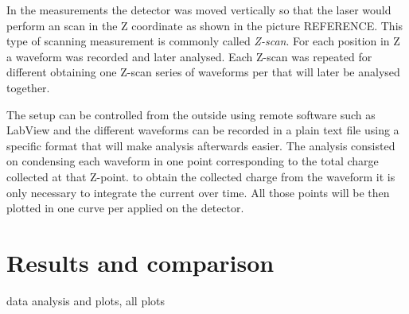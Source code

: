In the measurements the detector was moved vertically so that the laser would perform an scan in the Z coordinate as shown in the picture REFERENCE. This type of scanning measurement is commonly called \textit{Z-scan}. For each position in Z a waveform was recorded and later analysed. Each Z-scan was repeated for different \vias obtaining one Z-scan series of waveforms per \vias that will later be analysed together. 

The setup can be controlled from the outside using remote software such as LabView and the different waveforms can be recorded in a plain text file using a specific format that will make analysis afterwards easier. The analysis consisted on condensing each waveform in one point corresponding to the total charge collected at that Z-point. to obtain the collected charge from the waveform it is only necessary to integrate the current over time. All those points will be then plotted in one curve per \vias applied on the detector. 





\section{Results and comparison} %
\label{sec:future_projection}

data analysis and plots, all plots 


